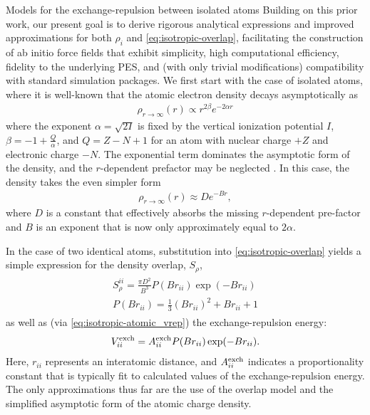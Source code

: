 \begin{subsection}{Models for the exchange-repulsion between isolated atoms}
Building on this prior work, our present goal
is to derive rigorous analytical expressions and improved approximations for
both $\rho_{i}$ and \cref{eq:isotropic-overlap}, facilitating the construction of ab initio force fields
that exhibit simplicity, high computational efficiency, fidelity to the underlying PES, and (with only trivial modifications) compatibility with standard simulation packages.
%
We first start with the case of isolated atoms, where it is well-known that the
atomic electron density decays asymptotically as
%
\begin{align}
\rho_{r \to \infty}(r) \propto r^{2\beta} e^{-2\alpha r}
\end{align}
%
where the exponent $\alpha = \sqrt{2I}$ is fixed by the vertical ionization potential
$I$, $\beta= -1 + \frac{Q}{\alpha}$, 
and $Q=Z-N+1$
for an
atom with nuclear charge $+Z$ and electronic charge $-N$.
\cite{PatilT-AsymptoticMethods,Hoffmann-Ostenhof1977,Amovilli2006,Misquitta2015a}
The exponential term dominates the asymptotic form of the density,
and the $r$-dependent prefactor may be neglected \cite{Nyeland1986, Ihm1990, Bunge1986, Misquitta2014}.
In this case, the density takes the even simpler form
%
\begin{align}
\label{eq:isotropic-rho_tail}
\rho_{r \to \infty}(r) \approx De^{-B r},
\end{align}
%
where $D$ is a constant that effectively absorbs the 
missing $r$-dependent pre-factor and $B$ is an exponent that is now only approximately equal to 
$2\alpha$. 

In the case of two identical atoms, 
substitution into \cref{eq:isotropic-overlap} yields a simple expression for the density overlap, $S_{\rho}$,
\cite{Tai1986,Rosen1931}
%
\begin{align}
\label{eq:isotropic-simple_overlap}
\begin{split}
S^{ii}_{\rho} = \frac{\pi D^2}{ B^{3}} P(B r_{ii}) \exp(-B r_{ii}) \\
P(B r_{ii}) = \frac13 (B r_{ii})^2 + B r_{ii} + 1 
\end{split}
\end{align}
%
as well as (via \cref{eq:isotropic-atomic_vrep}) the exchange-repulsion energy\cite{Ihm1990,Rappe1992}:
%
\begin{align}
\label{eq:isotropic-homoatomic_vrep}
V^{\text{exch}}_{ii} = A^{\text{exch}}_{ii} P(B r_{ii}) \exp(-B r_{ii}).
\end{align}
%
Here, $r_{ii}$ represents an interatomic distance, and $A^{\text{exch}}_{ii}$
indicates a proportionality constant that is typically fit to calculated
values of the exchange-repulsion energy. The only approximations thus far
are the use of the overlap model and the simplified asymptotic form of 
the atomic charge density.
%


\end{subsection}
